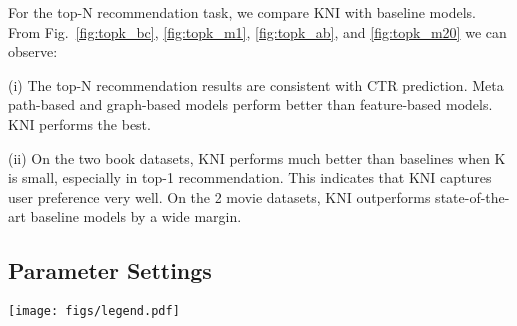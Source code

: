 \documentclass[sigconf]{acmart}
\begin{document}
For the top-N recommendation task, we compare KNI with baseline models.
From Fig.~\ref{fig:topk_bc}, \ref{fig:topk_m1}, \ref{fig:topk_ab}, and \ref{fig:topk_m20} we can observe:

(i) The top-N recommendation results are consistent with CTR prediction. Meta path-based and graph-based models perform better than feature-based models. KNI performs the best.
    
(ii) On the two book datasets, KNI performs much better than baselines when K is small, especially in top-1 recommendation. This indicates that KNI captures user preference very well. On the 2 movie datasets, KNI outperforms state-of-the-art baseline models by a wide margin.

\subsection{Parameter Settings}\label{sec:param}

\begin{figure*}
    \centering
    \texttt{[image: figs/legend.pdf]}
    \vspace{-10pt}
    \caption{Top-N recommendation results for C-Book.} \label{fig:topk_bc} \vspace{10pt}
     \vspace{-10pt}
    \caption{Top-N recommendation results for Movie-1M.} \label{fig:topk_m1} \vspace{10pt}
     \vspace{-10pt}
    \caption{Top-N recommendation results for A-Book.} \label{fig:topk_ab} \vspace{10pt}
     \vspace{-10pt}
    \caption{Top-N recommendation results for Movie-20M.} \label{fig:topk_m20}
\end{figure*}
\end{document}
